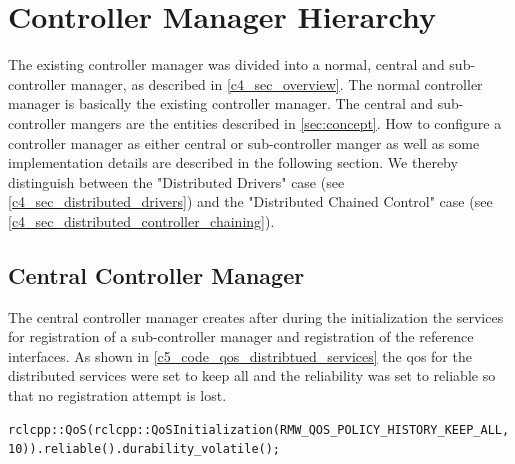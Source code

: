 \section{Controller Manager Hierarchy}
The existing controller manager was divided into a normal, central and sub-controller manager, as described in \autoref{c4_sec_overview}. The normal controller manager is basically the existing controller manager. The central and sub-controller mangers are the entities described in \autoref{sec:concept}. How to configure a controller manager as either central or sub-controller manger as well as some implementation details are described in the following section. We thereby distinguish between the "Distributed Drivers" case (see \autoref{c4_sec_distributed_drivers}) and the "Distributed Chained Control" case (see \autoref{c4_sec_distributed_controller_chaining}).

\subsection{Central Controller Manager}
The central controller manager creates after during the initialization the services for registration of a sub-controller manager and registration of the reference interfaces. As shown in \autoref{c5_code_qos_distribtued_services} the \gls{qos} for the distributed services were set to keep all and the reliability was set to reliable so that no registration attempt is lost. 
\lstset{language=C++,basicstyle=\small}
\begin{lstlisting}[caption=\gls{qos} for central controller managers distributed services.,label=c5_code_qos_distribtued_services]
    rclcpp::QoS(rclcpp::QoSInitialization(RMW_QOS_POLICY_HISTORY_KEEP_ALL, 10)).reliable().durability_volatile();
\end{lstlisting}

